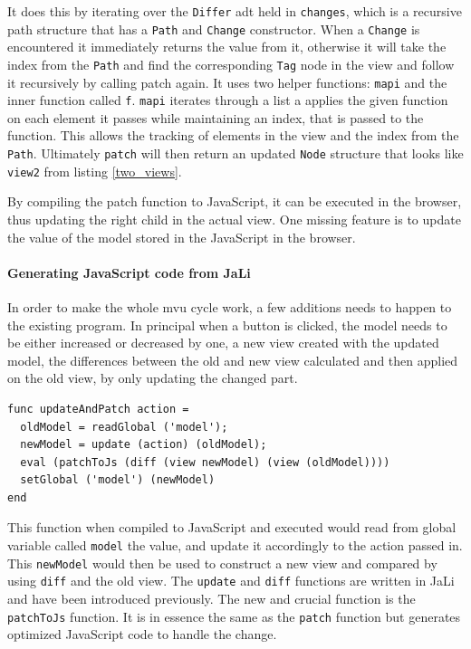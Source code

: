 

It does this by iterating over the \texttt{Differ} \gls{adt} held in \texttt{changes}, which is a recursive path structure that has a \texttt{Path} and \texttt{Change} constructor. When a \texttt{Change} is encountered it immediately returns the value from it, otherwise it will take the index from the \texttt{Path} and find the corresponding \texttt{Tag} node in the view and follow it recursively by calling patch again.
It uses two helper functions: \texttt{mapi} and the inner function called \texttt{f}. \texttt{mapi} iterates through a list a applies the given function on each element it passes while maintaining an index, that is passed to the function. This allows the tracking of elements in the view and the index from the \texttt{Path}.
Ultimately \texttt{patch} will then return an updated \texttt{Node} structure that looks like \texttt{view2} from listing \ref{two_views}.

By compiling the patch function to JavaScript, it can be executed in the browser, thus updating the right child in the actual view. One missing feature is to update the value of the model stored in the JavaScript in the browser. 

\paragraph{Generating JavaScript code from JaLi} In order to make the whole \gls{mvu} cycle work, a few additions needs to happen to the existing program. In principal when a button is clicked, the model needs to be either increased or decreased by one, a new view created with the updated model, the differences between the old and new view calculated and then applied on the old view, by only updating the changed part.

\begin{lstlisting}[columns=fullflexible, label={update_and_patch}, language=JaLi, caption=Update and patch on action]
func updateAndPatch action =
  oldModel = readGlobal ('model');
  newModel = update (action) (oldModel);
  eval (patchToJs (diff (view newModel) (view (oldModel))))
  setGlobal ('model') (newModel)
end
\end{lstlisting}

This function when compiled to JavaScript and executed would read from global variable called \texttt{model} the value, and update it accordingly to the action passed in. This \texttt{newModel} would then be used to construct a new view and compared by using \texttt{diff} and the old view.
The \texttt{update} and \texttt{diff} functions are written in JaLi and have been introduced previously. The new and crucial function is the \texttt{patchToJs} function. It is in essence the same as the \texttt{patch} function but generates optimized JavaScript code to handle the change.

